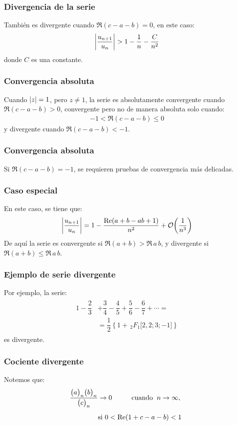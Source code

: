\documentclass[12pt]{beamer}
\begin{document}
\begin{frame}
\frametitle{Divergencia de la serie}
También es divergente cuando $\Re (c - a - b) = 0$, en este caso:
\pause
\begin{align*}
\abs{\dfrac{u_{n+1}}{u_{n}}} > 1 - \dfrac{1}{n} - \dfrac{C}{n^{2}}
\end{align*}
donde $C$ es una constante.
\end{frame}
\begin{frame}
\frametitle{Convergencia absoluta}
Cuando $\abs{z} = 1$, pero $z \neq 1$, la serie es absolutamente convergente cuando $\Re (c - a - b) > 0$, convergente pero no de manera absoluta solo cuando:
\pause
\begin{align*}
- 1 < \Re (c - a - b) \leq 0
\end{align*}
\pause
y divergente cuando $\Re (c - a - b) < -1$.
\end{frame}
\begin{frame}
\frametitle{Convergencia absoluta}
Si $\Re (c - a - b) = -1$, se requieren pruebas de convergencia más delicadas.
\end{frame}
\begin{frame}
\frametitle{Caso especial}
En este caso, se tiene que:
\pause
\begin{align}
\abs{\dfrac{u_{n+1}}{u_{n}}} = 1 - \dfrac{\Re (a + b - a b + 1)}{n^{2}} + \order{\dfrac{1}{n^{3}}}
\label{eq:ecuacion_01_01_01_15}
\end{align}
\pause
De aquí la serie es convergente si $\Re (a + b) > \Re \, a \, b$, y divergente si $\Re (a + b) \leq \Re \, a \, b$.
\end{frame}
\begin{frame}
\frametitle{Ejemplo de serie divergente}
Por ejemplo, la serie:
\pause
\begin{align}
\begin{aligned}
1 - \dfrac{2}{3} &+ \dfrac{3}{4} - \dfrac{4}{5} + \dfrac{5}{6} - \dfrac{6}{7} + \cdots = \\[0.5em]
&= \dfrac{1}{2} \left\{ 1 + \, {}_{2} F_{1} \big[ 2, 2; 3; -1 \big] \right\}
\end{aligned}
\label{eq:ecuacion_01_01_01_16}
\end{align}
es divergente.
\end{frame}
\begin{frame}
\frametitle{Cociente divergente}
Notemos que:
\pause
\begin{align}
\begin{aligned}
\dfrac{\big( a \big)_{n} \big( b \big)_{n}}{\big( c \big)_{n}} &\to 0 \hspace{1cm} \mbox{cuando} \hspace{0.2cm} n \to \infty, \hspace{0.2cm} \\[0.5em]
&\mbox{si } 0 < \Re (1 + c - a - b) < 1
\end{aligned}
\label{eq:ecuacion_01_01_01_17}
\end{align}
\end{frame}
\end{document}
